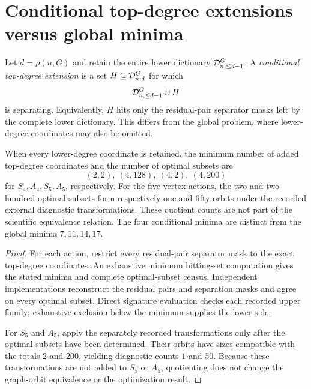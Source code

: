 \section{Conditional top-degree extensions versus global minima}
\label{sec:conditional}

Let $d=\rho(n,G)$ and retain the entire lower dictionary
$\mathcal{D}^G_{n,\leq d-1}$.  A \emph{conditional top-degree extension} is a set
$H\subseteq\mathcal{D}^G_{n,d}$ for which
\[
  \mathcal{D}^G_{n,\leq d-1}\cup H
\]
is separating.  Equivalently, $H$ hits only the residual-pair separator masks
left by the complete lower dictionary.  This differs from the global problem,
where lower-degree coordinates may also be omitted.

\begin{proposition}
\label{prop:conditional}
When every lower-degree coordinate is retained, the minimum number of added
top-degree coordinates and the number of optimal subsets are
\[
  (2,2),\ (4,128),\ (4,2),\ (4,200)
\]
for $S_4,A_4,S_5,A_5$, respectively.  For the five-vertex actions, the two and
two hundred optimal subsets form respectively one and fifty orbits under the
recorded external diagnostic transformations.  These quotient counts are not
part of the scientific equivalence relation.  The four conditional minima
are distinct from the global minima $7,11,14,17$.
\end{proposition}

\begin{proof}
For each action, restrict every residual-pair separator mask to the exact
top-degree coordinates.  An exhaustive minimum hitting-set computation gives
the stated minima and complete optimal-subset census.  Independent implementations
reconstruct the residual pairs and separation masks and agree on every
optimal subset.  Direct signature evaluation checks each recorded upper
family; exhaustive exclusion below the minimum supplies the lower side.

For $S_5$ and $A_5$, apply the separately recorded transformations only after
the optimal subsets have been determined.  Their orbits have sizes compatible
with the totals $2$ and $200$, yielding diagnostic counts $1$ and $50$.
Because these transformations are not added to $S_5$ or $A_5$, quotienting
does not change the graph-orbit equivalence or the optimization result.
\end{proof}



